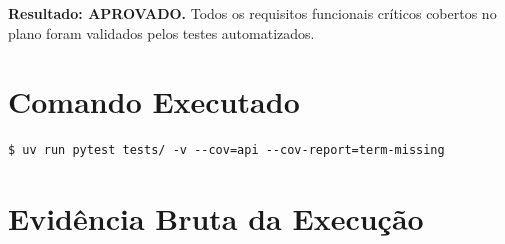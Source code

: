 \documentclass[11pt, a4paper]{article}
\begin{document}
\begin{successbox}
\textbf{Resultado: APROVADO.} Todos os requisitos funcionais críticos cobertos no plano foram validados pelos testes automatizados.
\end{successbox}

\section{Comando Executado}

\begin{lstlisting}[style=shellstyle]
$ uv run pytest tests/ -v --cov=api --cov-report=term-missing
\end{lstlisting}

\section{Evidência Bruta da Execução}
\end{document}
